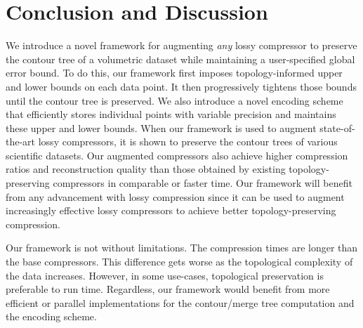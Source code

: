 \section{Conclusion and Discussion}
\label{sec:conclusion}

We introduce a novel framework for augmenting \emph{any} lossy compressor to preserve the contour tree of a volumetric dataset while maintaining a user-specified global error bound. 
To do this, our framework first imposes topology-informed upper and lower bounds on each data point. 
It then progressively tightens those bounds until the contour tree is preserved. 
We also introduce a novel encoding scheme that efficiently stores individual points with variable precision and maintains these upper and lower bounds. 
When our framework is used to augment state-of-the-art lossy compressors, it is shown to preserve the contour trees of various scientific datasets.
Our augmented compressors also achieve higher compression ratios and reconstruction quality than those obtained by existing topology-preserving compressors in comparable or faster time.
Our framework will benefit from any advancement with lossy compression since it can be used to augment increasingly effective lossy compressors to achieve better topology-preserving compression. 

Our framework is not without limitations. The compression times are longer than the base compressors. This difference gets worse as the topological complexity of the data increases.
However, in some use-cases, topological preservation is preferable to run time.
Regardless, our framework would benefit from more efficient or parallel implementations for the contour/merge tree computation and the encoding scheme. 
